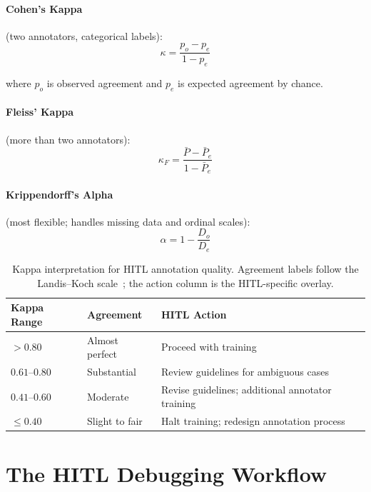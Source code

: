 \paragraph{Cohen's Kappa} (two annotators, categorical labels):
\begin{equation}
\kappa = \frac{p_o - p_e}{1 - p_e}
\label{eq:cohens-kappa}
\end{equation}

where $p_o$ is observed agreement and $p_e$ is expected agreement by chance.

\paragraph{Fleiss' Kappa} (more than two annotators):
\begin{equation}
\kappa_F = \frac{\bar{P} - \bar{P}_e}{1 - \bar{P}_e}
\end{equation}

\paragraph{Krippendorff's Alpha} (most flexible; handles missing data and ordinal scales):
\begin{equation}
\alpha = 1 - \frac{D_o}{D_e}
\end{equation}

\begin{table}[h]
\centering
\caption{Kappa interpretation for HITL annotation quality. Agreement labels follow the Landis--Koch scale~\autocite{landis1977kappa}; the action column is the HITL-specific overlay.}
\label{tab:kappa-interpretation}
\begin{tabularx}{\textwidth}{@{}llY@{}}
\toprule
\textbf{Kappa Range} & \textbf{Agreement} & \textbf{HITL Action} \\
\midrule
$> 0.80$ & Almost perfect & Proceed with training \\
$0.61$--$0.80$ & Substantial & Review guidelines for ambiguous cases \\
$0.41$--$0.60$ & Moderate & Revise guidelines; additional annotator training \\
$\leq 0.40$ & Slight to fair & Halt training; redesign annotation process \\
\bottomrule
\end{tabularx}
\end{table}

\section{The HITL Debugging Workflow}

